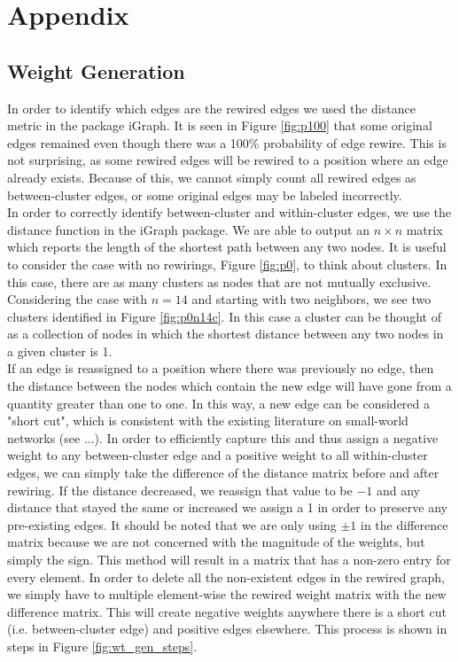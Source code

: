 \documentclass{article}
\begin{document}
\section{Appendix}
\subsection{Weight Generation}
In order to identify which edges are the rewired edges we used the distance metric in the package iGraph. It is seen in Figure \ref{fig:p100} that some original edges remained even though there was a 100\% probability of edge rewire. This is not surprising, as some rewired edges will be rewired to a position where an edge already exists. Because of this, we cannot simply count all rewired edges as between-cluster edges, or some original edges may be labeled incorrectly.
\\
In order to correctly identify between-cluster and within-cluster edges, we use the distance function in the iGraph package. We are able to output an $n \times n $ matrix which reports the length of the shortest path between any two nodes. It is useful to consider the case with no rewirings, Figure \ref{fig:p0}, to think about clusters. In this case, there are as many clusters as nodes that are not mutually exclusive. Considering the case with $n = 14$ and starting with two neighbors, we see two clusters identified in Figure \ref{fig:p0n14c}. In this case a cluster can be thought of as a collection of nodes in which the shortest distance between any two nodes in a given cluster is 1. 
\\
If an edge is reassigned to a position where there was previously no edge, then the distance between the nodes which contain the new edge will have gone from a quantity greater than one to one. In this way, a new edge can be considered a "short cut", which is consistent with the existing literature on small-world networks (see ...). In order to efficiently capture this and thus assign a negative weight to any between-cluster edge and a positive weight to all within-cluster edges, we can simply take the difference of the distance matrix before and after rewiring. If the distance decreased, we reassign that value to be $-1$ and any distance that stayed the same or increased we assign a 1 in order to preserve any pre-existing edges. It should be noted that we are only using $\pm 1$ in the difference matrix because we are not concerned with the magnitude of the weights, but simply the sign. This method will result in a matrix that has a non-zero entry for every element. In order to delete all the non-existent edges in the rewired graph, we simply have to multiple element-wise the rewired weight matrix with the new difference matrix. This will create negative weights anywhere there is a short cut (i.e. between-cluster edge) and positive edges elsewhere. This process is shown in steps in Figure \ref{fig:wt_gen_steps}.
\end{document}
